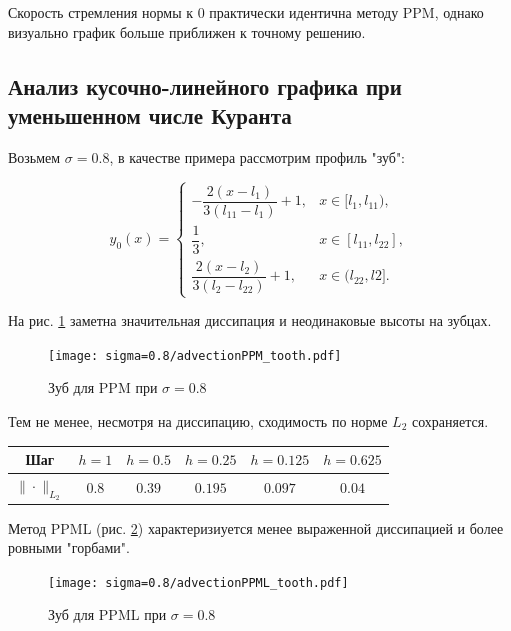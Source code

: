 \documentclass[12pt,a4paper]{article}
\newcommand{\picref}[1]{рис. \ref{#1}}
\begin{document}
    Скорость стремления нормы к $ 0 $ практически идентична методу PPM, однако визуально график больше приближен к точному решению.

    \subsection{Анализ кусочно-линейного графика при уменьшенном числе Куранта }

    Возьмем $ \sigma = 0.8 $, в качестве примера рассмотрим профиль "зуб":

    \pagebreak

    \[
        y_0(x) = \begin{cases}
            -\dfrac{2(x-l_1)}{3(l_{11}-l_1)} + 1, & x \in [l_1, l_{11}), \\[0.7em]
               \dfrac{1}{3}, & x \in [l_{11}, l_{22}],
               \\[0.7em]
           \dfrac{2(x-l_{2})}{3(l_2 - l_{22})} + 1, & x \in (l_{22}, l2].
       \end{cases}   
    \]

    На \picref{fig:ppm_tooth_08} заметна значительная диссипация и неодинаковые высоты на зубцах. 

    \begin{figure}[h]
        \centering
        \texttt{[image: sigma=0.8/advectionPPM\_tooth.pdf]}
        \caption{Зуб для PPM при $ \sigma = 0.8 $}
        \label{fig:ppm_tooth_08}
    \end{figure}

    Тем не менее, несмотря на диссипацию, сходимость по норме $ L_2 $ сохраняется.

    \begin{center}
        \begin{tabular}{ |c|c|c|c|c|c| } 
         \hline
         Шаг & $ h=1 $ &  $ h=0.5$ &  $ h=0.25 $ &  $ h=0.125 $ &  $ h=0.625 $ \\ 
         \hline
         $\| \cdot \|_{L_2}$ & $0.8$ & $0.39$ & $0.195$ & $0.097$ & $0.04$ \\
         \hline
        \end{tabular}
    \end{center}

    \pagebreak

    Метод PPML (\picref{fig:ppml_tooth_08}) характеризиуется менее выраженной диссипацией и более ровными "горбами". 

    \begin{figure}[h]
        \centering
        \texttt{[image: sigma=0.8/advectionPPML\_tooth.pdf]}
        \caption{Зуб для PPML при $ \sigma = 0.8 $}
        \label{fig:ppml_tooth_08}
    \end{figure}
\end{document}
